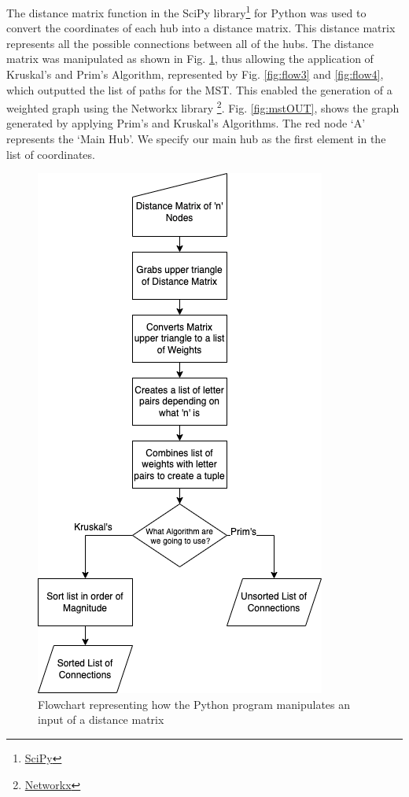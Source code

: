 \documentclass[twocolumn]{article}
\begin{document}
The distance matrix function in the SciPy library\footnote{\href{https://scipy.org/}{SciPy}} for Python was used to convert the coordinates of each hub into a distance matrix. This distance matrix represents all the possible connections between all of the hubs. 
The distance matrix was manipulated as shown in Fig. \ref{fig:flow1}, thus allowing the application of Kruskal’s and Prim’s Algorithm, represented by Fig. \ref{fig:flow3} and \ref{fig:flow4}, which outputted the list of paths for the MST.
This enabled the generation of a weighted graph using the Networkx library \footnote{\href{https://networkx.org/documentation/stable/auto_examples/drawing/plot_weighted_graph.html}{Networkx}}. Fig. \ref{fig:mstOUT}, shows the graph generated by applying Prim’s and Kruskal’s Algorithms. The red node ‘A’ represents the ‘Main Hub’. We specify our main hub as the first element in the list of coordinates.

\begin{figure}[H]
\centering
\includegraphics[width=0.70\columnwidth]{Figures/Flowchart 1.png}
\caption{Flowchart representing how the Python program manipulates an input of a distance matrix}
\label{fig:flow1}
\end{figure}
\end{document}
